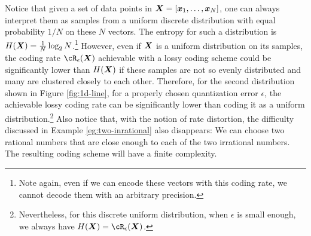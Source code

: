 \documentclass[../../book-main.tex]{subfiles}
\begin{document}
\begin{remark}
	Notice that given a set of data points in $\bm{X} = [\bm{x}_1,\ldots, \bm{x}_N]$, one can always interpret them as samples from a uniform discrete distribution with equal probability $1/N$ on these $N$ vectors. The entropy for such a distribution is $H(\bm{X}) = \frac{1}{N}\log_2 N$.\footnote{Note again, even if we can encode these vectors with this coding rate, we cannot decode them with an arbitrary precision.} However, even if $\bm{X}$ is  a uniform distribution on its samples, the coding rate $\cR_{\epsilon}(\X)$ achievable with a lossy coding scheme could be significantly lower than $H(\bm{X})$ if these samples are not so evenly distributed and many are clustered closely to each other. Therefore, for the second distribution shown in Figure \ref{fig:1d-line}, for a properly chosen quantization error  $\epsilon$, the achievable lossy coding rate can be significantly lower than coding it as a uniform distribution.\footnote{Nevertheless, for this discrete uniform distribution, when $\epsilon$ is small enough, we always have $H(\X) = \cR_{\epsilon}(\X)$.} Also notice that, with the notion of rate distortion, the difficulty discussed in Example \ref{eg:two-inrational} also disappears: We can choose two rational numbers that are close enough to each of the two irrational numbers. The resulting coding scheme will have a finite complexity. 
\end{remark}
\end{document}
